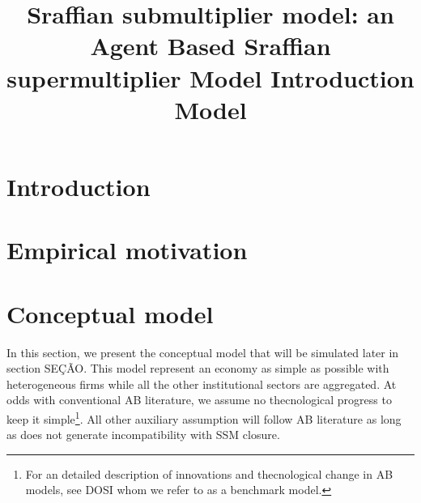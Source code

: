 \documentclass{SelfArx}
\date{}
\title{Sraffian submultiplier model: an Agent Based Sraffian supermultiplier Model Introduction Model}
\begin{document}


\newcommand{\keywordname}{Keywords} %


\flushbottom %
\maketitle %
\thispagestyle{empty} %

\section*{Introduction}
\label{sec:org21382be}


\section*{Empirical motivation}
\label{sec:org7563e47}
\section*{Conceptual model}
\label{sec:org72b8958}
In this section, we present the conceptual model that will be simulated later in section SEÇÃO.
This model represent an economy as simple as possible with heterogeneous firms while all the other institutional sectors are aggregated.
At odds with conventional AB literature, we assume no thecnological progress to keep it simple\footnote{For an detailed description of innovations and thecnological change in AB models, see DOSI whom we refer to as a benchmark model.}.
All other auxiliary assumption will follow AB literature as long as does not generate incompatibility with SSM closure.
\end{document}
